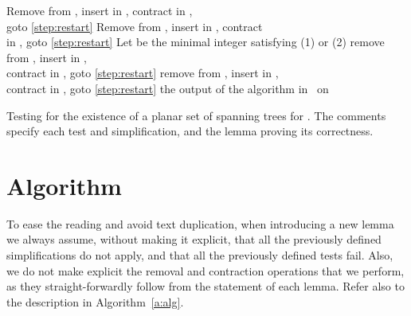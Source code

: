 \documentclass[letter,runningheads]{llncs}
\begin{document}
\begin{algorithm}
\begin{algorithmic}[1]
     \EndIf
{}
            \State Remove  from , insert  in , contract  in , \\\hspace{1.35cm} goto \eqref{step:restart} 
         \EndIf
            \State Remove  from , insert  in , contract  \\\hspace{1.35cm} in , goto \eqref{step:restart} 
         \EndIf
     \EndIf
         \State Let  be the minimal integer satisfying (1) or (2)
         \lIf{} remove  from , insert  in , \\\hspace{3.55cm} contract  in , goto \eqref{step:restart}
         \lIf{} remove  from , insert  in , \\\hspace{3.62cm} contract  in , goto \eqref{step:restart}
     \EndIf
\EndWhile
\State \Return the output of the algorithm in~\cite{df-ectefcgsf-09} on  
\end{algorithmic}
\caption{Testing for the existence of a planar set  of spanning trees for \label{a:alg}. The comments specify each test and simplification, and the lemma proving its correctness.}
\end{algorithm}


\section{Algorithm} \label{se:algorithm}

To ease the reading and avoid text duplication, when introducing a new lemma we always assume, without making it explicit, that all the previously defined simplifications do not apply, and that all the previously defined tests fail. Also, we do not make explicit the removal and contraction operations that we perform, as they straight-forwardly follow from the statement of each lemma. Refer also to the description in Algorithm~\ref{a:alg}.
\end{document}
